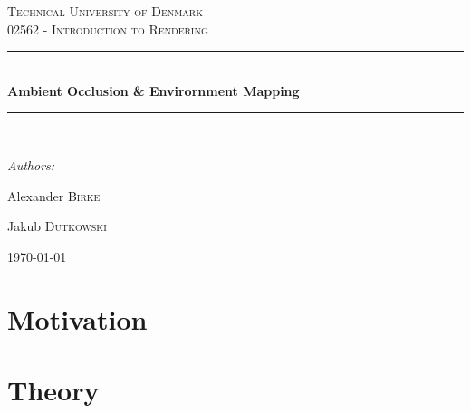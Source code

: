 \documentclass[12pt, twoside,a4paper]{report}
\newcommand{\HRule}{\rule{\linewidth}{0.5mm}}
\begin{document}








\begin{titlepage}
\begin{center}

\textsc{\LARGE Technical University of Denmark}\\[1.5cm]

\textsc{\Large 02562 - Introduction to Rendering}\\[0.5cm]
\HRule \\[0.4cm]
{ \huge \bfseries Ambient Occlusion \& Envirornment Mapping}\\[0.4cm]
\HRule \\[1.5cm]
\begin{center}
\emph{Authors:}\\
\end{center}
\begin{minipage}{0.4\textwidth}
\begin{flushleft} \large
Alexander \textsc{Birke}
\end{flushleft}
\end{minipage}
\begin{minipage}{0.4\textwidth}
\begin{flushright} \large
Jakub \textsc{Dutkowski}
\end{flushright}
\end{minipage}

\vfill

{\large \today}

\end{center}

\end{titlepage}

\tableofcontents
\chapter{Motivation}


\chapter{Theory}

\end{document}

